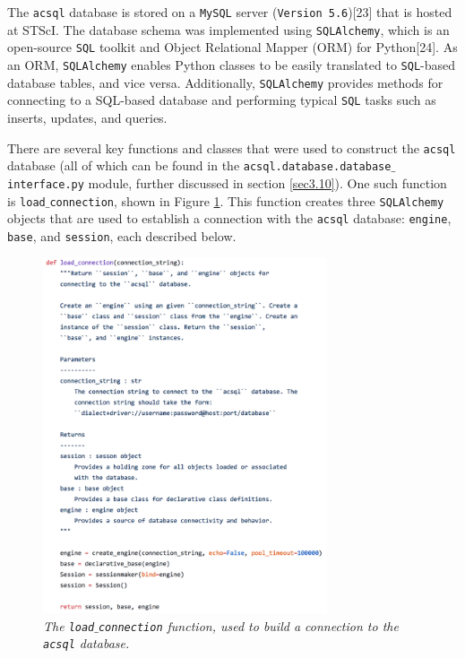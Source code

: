 \documentclass[10pt,journal,compsoc]{IEEEtran}
\begin{document}
The \texttt{acsql} database is stored on a \texttt{MySQL} server (\texttt{Version 5.6})[23] that is hosted at STScI.  The database schema was implemented using \texttt{SQLAlchemy}, which
is an open-source \texttt{SQL} toolkit and Object Relational Mapper (ORM) for Python[24].  As an ORM, \texttt{SQLAlchemy} enables Python classes to be easily translated to
\texttt{SQL}-based database tables, and vice versa.  Additionally, \texttt{SQLAlchemy} provides methods for connecting to a SQL-based database and performing typical \texttt{SQL}
tasks such as inserts, updates, and queries.

There are several key functions and classes that were used to construct the \texttt{acsql} database (all of which can be found in the \texttt{acsql.database.database$\_$interface.py}
module, further discussed in section \ref{sec3.10}). One such function is \texttt{load$\_$connection}, shown in Figure \ref{fig12}.  This function creates three \texttt{SQLAlchemy}
objects that are used to establish a connection with the \texttt{acsql} database: \texttt{engine}, \texttt{base}, and \texttt{session}, each described below.

\begin{figure}[!h]
\centering
\includegraphics[width=3.3in]{./figures/load_connection.png}
\caption{\textit{The \texttt{load$\_$connection} function, used to build a connection to the \texttt{acsql} database.}}
\label{fig12}
\end{figure}
\end{document}
